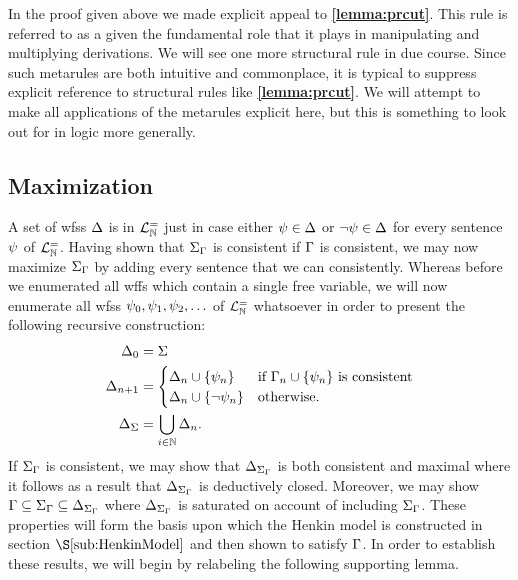 In the proof given above we made explicit appeal to \textbf{\ref{lemma:prcut}}.
This rule is referred to as a  given the fundamental role that it plays in manipulating and multiplying derivations.
We will see one more structural rule in due course.
Since such metarules are both intuitive and commonplace, it is typical to suppress explicit reference to structural rules like \textbf{\ref{lemma:prcut}}.
We will attempt to make all applications of the metarules explicit here, but this is something to look out for in logic more generally.



\subsection{Maximization}%
  \label{sub:Maximization}
  
A set of wfss $\Delta$ is  in $\mathcal{L}^{=}_{\mathbb{N}}$ just in case either $\psi\in\Delta$ or $\neg\psi\in\Delta$ for every sentence $\psi$ of $\mathcal{L}^{=}_{\mathbb{N}}$.
Having shown that $\Sigma_{\Gamma}$ is consistent if $\Gamma$ is consistent, we may now maximize $\Sigma_{\Gamma}$ by adding every sentence that we can consistently. 
Whereas before we enumerated all wffs which contain a single free variable, we will now enumerate all wfss $\psi_0,\psi_1,\psi_2,\ldots$ of $\mathcal{L}^{=}_{\mathbb{N}}$ whatsoever in order to present the following recursive construction:
\begin{align*}
  \Delta_0     &= \Sigma \\
  \Delta_{n+1} &= 
    \begin{cases}
      \Delta_n\cup\lbrace\psi_n\rbrace &\text{if } \Gamma_n\cup\lbrace\psi_n\rbrace \text{ is consistent}\\
      \Delta_n\cup\lbrace\neg\psi_n\rbrace &\text{otherwise}.
    \end{cases}\\
  \Delta_{\Sigma} &= \bigcup_{i\in\mathbb{N}}\Delta_n. 
\end{align*}
If $\Sigma_{\Gamma}$ is consistent, we may show that $\Delta_{\Sigma_{\Gamma}}$ is both consistent and maximal where it follows as a result that $\Delta_{\Sigma_{\Gamma}}$ is deductively closed.
Moreover, we may show $\Gamma\subseteq\Sigma_{\Gamma}\subseteq\Delta_{\Sigma_{\Gamma}}$ where $\Delta_{\Sigma_{\Gamma}}$ is saturated on account of including $\Sigma_{\Gamma}$.
These properties will form the basis upon which the Henkin model is constructed in section $\S\ref{sub:HenkinModel}$ and then shown to satisfy $\Gamma$.
In order to establish these results, we will begin by relabeling the following supporting lemma.




